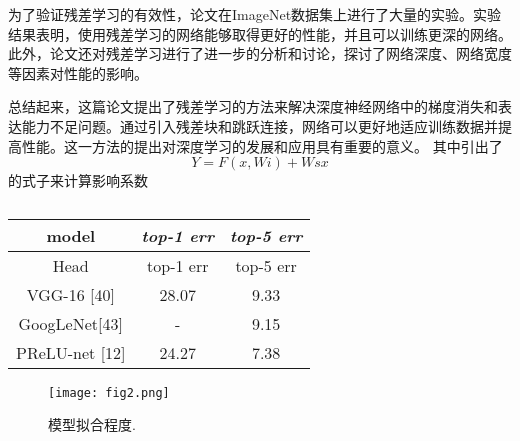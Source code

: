 \documentclass[conference]{IEEEtran}
\begin{document}
为了验证残差学习的有效性，论文在ImageNet数据集上进行了大量的实验。实验结果表明，使用残差学习的网络能够取得更好的性能，并且可以训练更深的网络。此外，论文还对残差学习进行了进一步的分析和讨论，探讨了网络深度、网络宽度等因素对性能的影响。

总结起来，这篇论文提出了残差学习的方法来解决深度神经网络中的梯度消失和表达能力不足问题。通过引入残差块和跳跃连接，网络可以更好地适应训练数据并提高性能。这一方法的提出对深度学习的发展和应用具有重要的意义。
其中引出了
\begin{equation}
Y= F(x, {Wi}) + Wsx
\end{equation}
的式子来计算影响系数




\begin{table}[htbp]
\caption{}
\begin{center}
\begin{tabular}{|c|c|c|}
\hline
\textbf{model}& \textbf{\textit{top-1 err}}& \textbf{\textit{ top-5 err}}\\
\hline
Head & top-1 err& top-5 err\\
\hline
 VGG-16 [40] &28.07 &9.33\\
\hline
GoogLeNet[43]& - &9.15\\
\hline
PReLU-net [12] &24.27 &7.38
\\


\end{tabular}
\label{tab1}
\end{center}
\end{table}

\begin{figure}[htbp]
\centerline{\texttt{[image: fig2.png]}}
\caption{模型拟合程度.}
\label{fig}
\end{figure}
\end{document}
